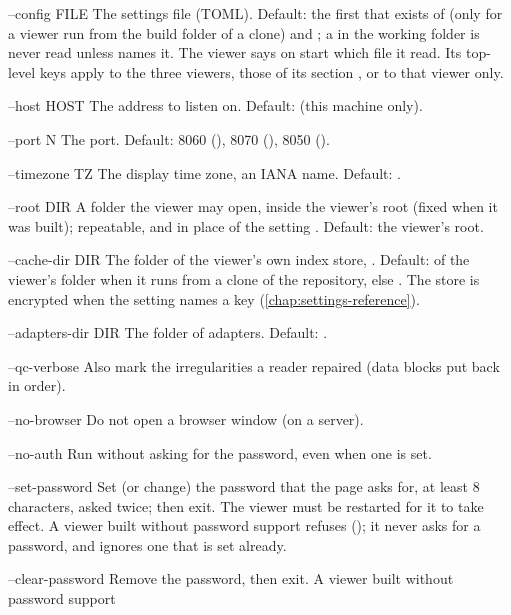 \begin{params}
\item[--config FILE] The settings file (TOML). Default: the first that exists of
   (only for a viewer run from the build folder of a
  clone) and ; a
   in the working folder is never read unless  names it.
  The viewer says on start which file it read. Its top-level keys apply to the
  three viewers, those of its section \code{[rs]}, \code{[cpp]} or \code{[py]} to that viewer
  only.
\item[--host HOST] The address to listen on. Default:  (this machine only).
\item[--port N] The port. Default: 8060 (), 8070 (),
  8050 ().
\item[--timezone TZ] The display time zone, an IANA name. Default: .
\item[--root DIR] A folder the viewer may open, inside the viewer's root (fixed when it was
  built); repeatable, and in place of the setting . Default: the viewer's root.
\item[--cache-dir DIR] The folder of the viewer's own index store, . Default:
   of the viewer's folder when it runs from a clone of the
  repository, else . The store is encrypted when the
  setting  names a key (\cref{chap:settings-reference}).
\item[--adapters-dir DIR] The folder of adapters. Default:
  .
\item[--qc-verbose] Also mark the irregularities a reader repaired (data blocks put back in
  order).
\item[--no-browser] Do not open a browser window (on a server).
\item[--no-auth] Run without asking for the password, even when one is set.
\item[--set-password] Set (or change) the password that the page asks for, at least 8
  characters, asked twice; then exit. The viewer must be restarted for it to take effect. A
  viewer built without password support refuses (); it never asks for a password, and ignores one that is set already.
\item[--clear-password] Remove the password, then exit. A viewer built without password support

\end{params}

